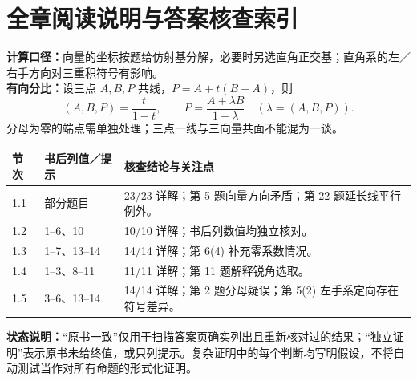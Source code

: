 \documentclass[UTF8,a4paper,11pt,fontset=none]{ctexart}
\newcommand{\tip}[1]{\begin{tcolorbox}[colback=light,colframe=rulegray,boxrule=0.4pt,arc=1.5mm,left=3mm,right=3mm,top=2mm,bottom=2mm]#1\end{tcolorbox}}
\begin{document}
\section*{全章阅读说明与答案核查索引}
\noindent\textbf{计算口径：}向量的坐标按题给仿射基分解，必要时另选直角正交基；直角系的左／右手方向对三重积符号有影响。\\
\textbf{有向分比：}设三点 $A,B,P$ 共线，$P=A+t(B-A)$，则
\begin{equation}\label{eq:ratio}
(A,B,P)=\frac{t}{1-t},\qquad
P=\frac{A+\lambda B}{1+\lambda}\quad(\lambda=(A,B,P)).
\end{equation}
分母为零的端点需单独处理；三点一线与三向量共面不能混为一谈。
\par\smallskip\par\noindent\begin{tabularx}{\linewidth}{@{}p{17mm}p{35mm}X@{}}\toprule
节次 & 书后列值／提示 & 核查结论与关注点\\\midrule
1.1 & 部分题目 & 23/23 详解；第 5 题向量方向矛盾；第 22 题延长线平行例外。\\
1.2 & 1--6、10 & 10/10 详解；书后列数值均独立核对。\\
1.3 & 1--7、13--14 & 14/14 详解；第 6(4) 补充零系数情况。\\
1.4 & 1--3、8--11 & 11/11 详解；第 11 题解释锐角选取。\\
1.5 & 3--6、13--14 & 14/14 详解；第 2 题分母疑误；第 5(2) 左手系定向存在符号差异。\\\bottomrule
\end{tabularx}\par\medskip
\tip{\textbf{状态说明：}“原书一致”仅用于扫描答案页确实列出且重新核对过的结果；“独立证明”表示原书未给终值，或只列提示。复杂证明中的每个判断均写明假设，不将自动测试当作对所有命题的形式化证明。}
\clearpage
\end{document}
